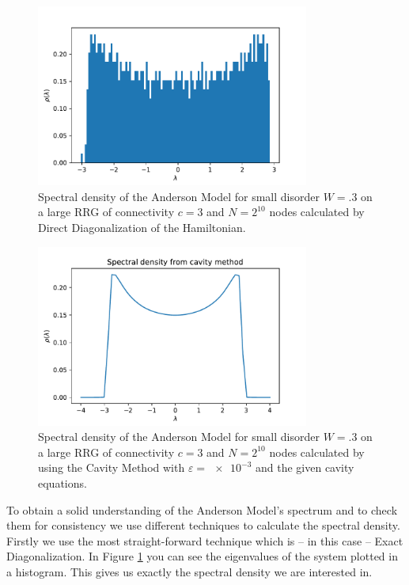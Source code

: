 \documentclass[../main.tex]{subfiles}
\begin{document}
\begin{figure}[htpb]
    \centering
    \includegraphics[width=0.8\textwidth]{../figures/ex3_spectrum_exact_diag.pdf}
    \caption{Spectral density of the Anderson Model for small disorder $W = \num{.3}$ on a large RRG of connectivity $c=3$ and $ N = 2^{10}$ nodes calculated by Direct Diagonalization of the Hamiltonian.}
    \label{fig:spectrum_exact_diagonalization}
\end{figure}

\begin{figure}[htpb]
    \centering
    \includegraphics[width=0.8\textwidth]{../figures/ex3_spectrum_cavity.pdf}
    \caption{Spectral density of the Anderson Model for small disorder $W = \num{.3}$ on a large RRG of connectivity $c=3$ and $ N = 2^{10}$ nodes calculated by using the Cavity Method with $\varepsilon = \num{e-3}$ and the given cavity equations.}
    \label{fig:spectrum_cavity_method}
\end{figure}

To obtain a solid understanding of the Anderson Model's spectrum and to check them for consistency we use different techniques to calculate the spectral density.
Firstly we use the most straight-forward technique which is -- in this case -- Exact Diagonalization.
In Figure \ref{fig:spectrum_exact_diagonalization} you can see the eigenvalues of the system plotted in a histogram.
This gives us exactly the spectral density we are interested in.
\par
\end{document}
